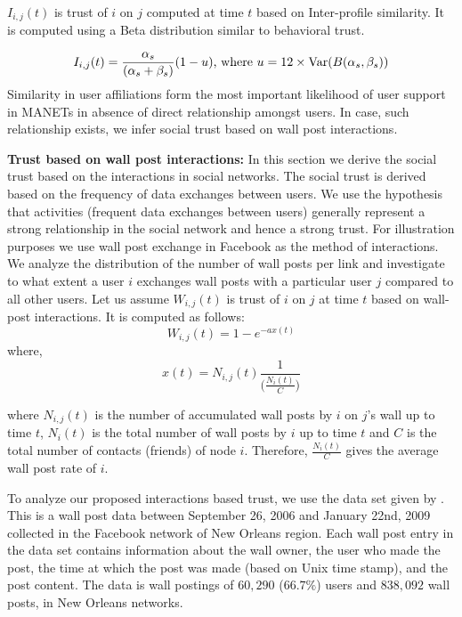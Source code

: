 \documentclass[conference]{IEEEtran}
\begin{document}
$I_{i,j}(t)$ is trust of $i$ on $j$ computed at time $t$ based on Inter-profile similarity. It is computed using a Beta distribution similar to behavioral trust.

\begin{equation}
I_{i,j}(t) = \frac{\alpha_s}{(\alpha_s+\beta_s)}(1-u)\textrm{, where }  u = 12 \times {\rm Var} ( B(\alpha_s, \beta_s) )
\label{social_ips_1}
\end{equation}
Similarity in user affiliations form the most important likelihood of user support in MANETs in absence of direct relationship  amongst users. In case, such relationship exists, we infer social trust based on wall post interactions.


{\bf Trust based on wall post interactions:}
In this section we derive the social trust based on the interactions in social networks. The social trust is derived based on the frequency of data exchanges between users. We use the hypothesis that activities (frequent data exchanges between users) generally represent a strong relationship in the social network and hence a strong trust. For illustration purposes we use wall post exchange in Facebook as the method of interactions. We analyze the distribution of the number of wall posts per link and investigate to what extent a user $i$ exchanges wall posts with a particular user $j$ compared to all other users. Let us assume $W_{i,j}(t)$ is trust of $i$ on $j$ at time $t$ based on wall-post interactions. It is computed as follows:
\begin{equation}
W_{i,j}(t) = 1- e^{-ax(t)}
\label{wall_post_trust}
\end{equation}
where,
\[x(t) =  N_{i,j}(t) \frac{1}{    \big(\frac{N_i(t)}{C} \big)  } \]

where $N_{i,j}(t)$ is the number of accumulated wall posts by $i$ on $j$'s wall up to time $t$, $N_i(t)$ is the total number of wall posts by $i$ up to time $t$ and $C$ is the total number of contacts (friends) of node $i$. Therefore, $\frac{N_i(t)}{C}$ gives the average wall post rate of $i$.

To analyze our proposed interactions based trust, we use the data set given by \cite{Viswanath:2009, social_data_1}. This is a wall post data between September 26, 2006 and January 22nd, 2009 collected in the Facebook network of New Orleans region. Each wall post entry in the data set contains information about the wall owner, the user who made the post, the time at which the post was made (based on Unix time stamp), and the post content. The data is wall postings of $60,290$ ($66.7\%$) users and $838,092$ wall posts, in New Orleans networks.
\end{document}
